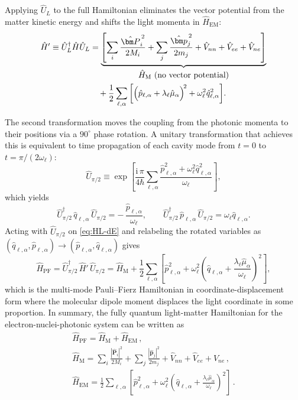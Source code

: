 Applying $\hat{U}_{L}$ to the full Hamiltonian eliminates the vector potential from the matter kinetic energy and shifts the light momenta in $\hat{H}_\mathrm{EM}$:
\begin{align}
\hat{H}' \equiv \hat{U}_{L}^{\dagger} \hat{H} \hat{U}_{L}
&= \underbrace{\left[\sum_i \frac{\hat{\bm P}_i^{\,2}}{2M_i} + \sum_j \frac{\hat{\bm p}_j^{\,2}}{2m_j} + \hat{V}_{nn}+\hat{V}_{ee}+\hat{V}_{ne}\right]}_{\displaystyle \hat{H}_\mathrm{M}\ \text{(no vector potential)}} \notag\\
&\quad + \frac{1}{2} \sum_{\ell,\alpha}\bigg[\Big(\hat{p}_{\ell,\alpha} + \lambda_\ell \hat{\mu}_\alpha\Big)^{\!2} + \omega_\ell^2 \hat{q}_{\ell,\alpha}^2\bigg] .
\label{eq:HL-dE}
\end{align}

The second transformation moves the coupling from the photonic momenta to their positions via a $90^\circ$ phase rotation. A unitary transformation that achieves this is equivalent to time propagation of each cavity mode from $t=0$ to  $t=\pi/(2\omega_\ell)$:
\begin{equation}
\hat{U}_{\pi/2} \equiv
\exp\!\left[\frac{\mathrm i\,\pi}{4\hbar}\sum_{\ell,\alpha}\frac{\hat{p}_{\ell,\alpha}^{2}
+\omega_\ell^{2}\hat{q}_{\ell,\alpha}^{2}}{\omega_\ell}\right],
\end{equation}
which yields
\begin{equation}
\hat{U}_{\pi/2}^{\dagger}\,\hat{q}_{\ell,\alpha}\,\hat{U}_{\pi/2} = -\,\frac{\hat{p}_{\ell,\alpha}}{\omega_\ell},
\qquad
\hat{U}_{\pi/2}^{\dagger}\,\hat{p}_{\ell,\alpha}\,\hat{U}_{\pi/2} = \omega_\ell \hat{q}_{\ell,\alpha}.
\end{equation}
Acting with $\hat{U}_{\pi/2}$ on \cref{eq:HL-dE} and relabeling the rotated variables as $(\hat{q}_{\ell,\alpha},\hat{p}_{\ell,\alpha}) \to (\hat{p}_{\ell,\alpha},\hat{q}_{\ell,\alpha})$ gives
\begin{equation}
\hat{H}_{\mathrm{PF}}
= \hat{U}_{\pi/2}^{\dagger}\, \hat{H}'\, \hat{U}_{\pi/2}
= \hat{H}_\mathrm{M} + \frac{1}{2} \sum_{\ell,\alpha}\left[\hat{p}_{\ell,\alpha}^2
+ \omega_\ell^2\!\left(\hat{q}_{\ell,\alpha} + \frac{\lambda_\ell\hat{\mu}_\alpha}{\omega_\ell}\right)^{\!2} \right],
\label{eq:PF-final}
\end{equation}
which is the multi-mode Pauli--Fierz Hamiltonian in coordinate-displacement form where the molecular dipole moment displaces the light coordinate in some proportion.
In summary, the fully quantum light-matter Hamiltonian for the electron-nuclei-photonic system can be written as %
\begin{gather}
\hat{H}_\mathrm{PF} = \hat{H}_\mathrm{M}+\hat{H}_\mathrm{EM} \,, \label{eq:H-final}
\\
\hat{H}_\mathrm{M} = \sum_i \frac{|\hat{\bm P}_i|^{2}}{2M_i} + \sum_j \frac{|\hat{\bm p}_j|^{2}}{2m_j} + \hat{V}_{nn}+\hat{V}_{ee}+\hat{V}_{ne} \,, \label{eq:HM-final}
\\
\hat{H}_\mathrm{EM} = \frac{1}{2} \sum_{\ell,\alpha}\left[
\hat{p}_{\ell,\alpha}^2 + \omega_\ell^2\!\left(\hat{q}_{\ell,\alpha} + \frac{\lambda_\ell \hat{\mu}_\alpha }{\omega_\ell}\right)^{2} \right] \,. \label{eq:HF-final}
\end{gather}

